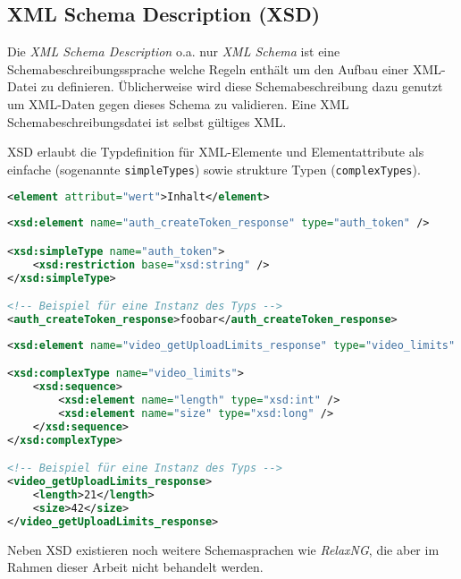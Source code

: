 \subsection{XML Schema Description (XSD)}

Die \emph{XML Schema Description} o.a. nur \emph{XML Schema} ist eine Schemabeschreibungssprache welche Regeln enthält um den Aufbau einer XML-Datei zu definieren. Üblicherweise wird diese Schemabeschreibung dazu genutzt um XML-Daten gegen dieses Schema zu validieren. Eine XML Schemabeschreibungsdatei ist selbst gültiges XML.

\gls{XSD} erlaubt die Typdefinition für XML-Elemente und Elementattribute als einfache (sogenannte \texttt{simpleTypes}) sowie strukture Typen (\texttt{complexTypes}).

\begin{lstlisting}[language=XML, caption=Minimalbeispiel für ein XML-Element]
<element attribut="wert">Inhalt</element>
\end{lstlisting}

\begin{lstlisting}[language=XML, label=lst:simple, caption=Beispiel für einen einfachen Schematyp \cite{facebookXSD}]
<xsd:element name="auth_createToken_response" type="auth_token" />

<xsd:simpleType name="auth_token">
    <xsd:restriction base="xsd:string" />
</xsd:simpleType>

<!-- Beispiel für eine Instanz des Typs -->
<auth_createToken_response>foobar</auth_createToken_response>
\end{lstlisting}

\begin{lstlisting}[language=XML, label=lst:complex, caption=Beispiel für einen strukturierten Schematyp \cite{facebookXSD}]
<xsd:element name="video_getUploadLimits_response" type="video_limits" />

<xsd:complexType name="video_limits">
    <xsd:sequence>
        <xsd:element name="length" type="xsd:int" />
        <xsd:element name="size" type="xsd:long" />
    </xsd:sequence>
</xsd:complexType>

<!-- Beispiel für eine Instanz des Typs -->
<video_getUploadLimits_response>
    <length>21</length>
    <size>42</size>
</video_getUploadLimits_response>
\end{lstlisting}

Neben \gls{XSD} existieren noch weitere Schemasprachen wie \emph{RelaxNG}, die aber im Rahmen dieser Arbeit nicht behandelt werden.